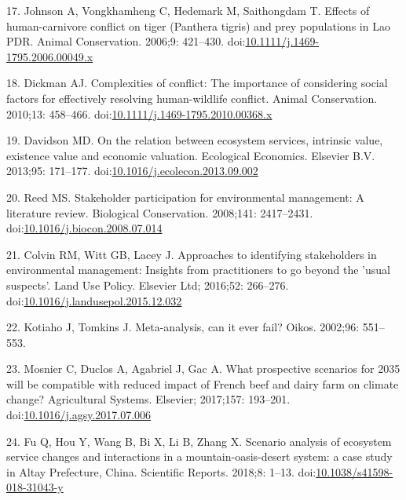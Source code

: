 \documentclass[10pt,letterpaper]{article}
\begin{document}
\hypertarget{ref-Johnson2006}{}
17. Johnson A, Vongkhamheng C, Hedemark M, Saithongdam T. Effects of
human-carnivore conflict on tiger (Panthera tigris) and prey populations
in Lao PDR. Animal Conservation. 2006;9: 421--430.
doi:\href{https://doi.org/10.1111/j.1469-1795.2006.00049.x}{10.1111/j.1469-1795.2006.00049.x}

\hypertarget{ref-Dickman2010}{}
18. Dickman AJ. Complexities of conflict: The importance of considering
social factors for effectively resolving human-wildlife conflict. Animal
Conservation. 2010;13: 458--466.
doi:\href{https://doi.org/10.1111/j.1469-1795.2010.00368.x}{10.1111/j.1469-1795.2010.00368.x}

\hypertarget{ref-Davidson2013}{}
19. Davidson MD. On the relation between ecosystem services, intrinsic
value, existence value and economic valuation. Ecological Economics.
Elsevier B.V. 2013;95: 171--177.
doi:\href{https://doi.org/10.1016/j.ecolecon.2013.09.002}{10.1016/j.ecolecon.2013.09.002}

\hypertarget{ref-Reed2008}{}
20. Reed MS. Stakeholder participation for environmental management: A
literature review. Biological Conservation. 2008;141: 2417--2431.
doi:\href{https://doi.org/10.1016/j.biocon.2008.07.014}{10.1016/j.biocon.2008.07.014}

\hypertarget{ref-Colvin2016}{}
21. Colvin RM, Witt GB, Lacey J. Approaches to identifying stakeholders
in environmental management: Insights from practitioners to go beyond
the 'usual suspects'. Land Use Policy. Elsevier Ltd; 2016;52: 266--276.
doi:\href{https://doi.org/10.1016/j.landusepol.2015.12.032}{10.1016/j.landusepol.2015.12.032}

\hypertarget{ref-Kotiaho2002}{}
22. Kotiaho J, Tomkins J. Meta-analysis, can it ever fail? Oikos.
2002;96: 551--553.

\hypertarget{ref-Mosnier2017}{}
23. Mosnier C, Duclos A, Agabriel J, Gac A. What prospective scenarios
for 2035 will be compatible with reduced impact of French beef and dairy
farm on climate change? Agricultural Systems. Elsevier; 2017;157:
193--201.
doi:\href{https://doi.org/10.1016/j.agsy.2017.07.006}{10.1016/j.agsy.2017.07.006}

\hypertarget{ref-Fu2018}{}
24. Fu Q, Hou Y, Wang B, Bi X, Li B, Zhang X. Scenario analysis of
ecosystem service changes and interactions in a mountain-oasis-desert
system: a case study in Altay Prefecture, China. Scientific Reports.
2018;8: 1--13.
doi:\href{https://doi.org/10.1038/s41598-018-31043-y}{10.1038/s41598-018-31043-y}
\end{document}
